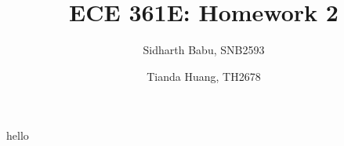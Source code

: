 \documentclass{article}
\author{Sidharth Babu, SNB2593 \and Tianda Huang, TH2678}
\title{ECE 361E: Homework 2}
\begin{document}
\begin{mdframed}
    \maketitle
\end{mdframed}
\pagebreak
hello
\end{document}
